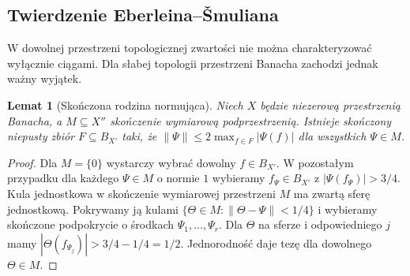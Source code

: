 \documentclass[11pt,a4paper]{article}
\numberwithin{equation}{section}
\theoremstyle{plain}
\newtheorem{lemat}[twierdzenie]{Lemat}
\theoremstyle{definition}
\theoremstyle{remark}
\begin{document}
\subsection{Twierdzenie Eberleina--\v Smuliana}

W dowolnej przestrzeni topologicznej zwartości nie można
charakteryzować wyłącznie ciągami. Dla słabej topologii
przestrzeni Banacha zachodzi jednak ważny wyjątek.

\begin{lemat}[Skończona rodzina normująca]
\label{lem:finite-norming26}
Niech $X$ będzie niezerową przestrzenią Banacha,
a $M\subseteq X''$ skończenie wymiarową podprzestrzenią.
Istnieje skończony niepusty zbiór $F\subseteq B_{X'}$ taki, że
$\|\Psi\|\le 2\max_{f\in F}|\Psi(f)|$ dla wszystkich $\Psi\in M$.
\end{lemat}
\begin{proof}
Dla $M=\{0\}$ wystarczy wybrać dowolny $f\in B_{X'}$.
W pozostałym przypadku dla każdego $\Psi\in M$ o normie $1$
wybieramy $f_\Psi\in B_{X'}$ z
$|\Psi(f_\Psi)|>3/4$. Kula jednostkowa w skończenie
wymiarowej przestrzeni $M$ ma zwartą sferę jednostkową.
Pokrywamy ją kulami $\{\Theta\in M:\|\Theta-\Psi\|<1/4\}$
i wybieramy skończone podpokrycie o środkach
$\Psi_1,\ldots,\Psi_r$. Dla $\Theta$ na sferze i odpowiedniego
$j$ mamy $|\Theta(f_{\Psi_j})|>3/4-1/4=1/2$.
Jednorodność daje tezę dla dowolnego $\Theta\in M$.
\end{proof}
\end{document}
